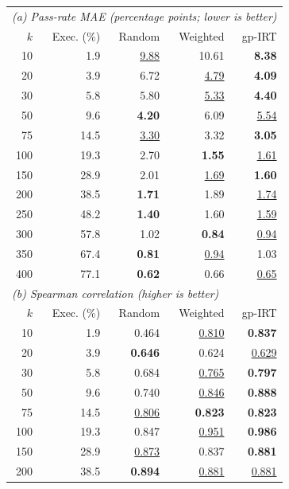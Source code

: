 \begin{table}[t]
  \centering
  \small
  \setlength{\tabcolsep}{3.5pt}
  \begin{tabular}{rrrrr}
    \toprule
    \multicolumn{5}{l}{\textit{(a) Pass-rate MAE (percentage points; lower is better)}} \\
    $k$ & Exec. (\%) & Random & Weighted & gp-IRT \\
    \midrule
    10 & 1.9 & \underline{9.88} & 10.61 & \textbf{8.38} \\
    20 & 3.9 & 6.72 & \underline{4.79} & \textbf{4.09} \\
    30 & 5.8 & 5.80 & \underline{5.33} & \textbf{4.40} \\
    50 & 9.6 & \textbf{4.20} & 6.09 & \underline{5.54} \\
    75 & 14.5 & \underline{3.30} & 3.32 & \textbf{3.05} \\
    100 & 19.3 & 2.70 & \textbf{1.55} & \underline{1.61} \\
    150 & 28.9 & 2.01 & \underline{1.69} & \textbf{1.60} \\
    200 & 38.5 & \textbf{1.71} & 1.89 & \underline{1.74} \\
    250 & 48.2 & \textbf{1.40} & 1.60 & \underline{1.59} \\
    300 & 57.8 & 1.02 & \textbf{0.84} & \underline{0.94} \\
    350 & 67.4 & \textbf{0.81} & \underline{0.94} & 1.03 \\
    400 & 77.1 & \textbf{0.62} & 0.66 & \underline{0.65} \\
    \midrule
    \multicolumn{5}{l}{\textit{(b) Spearman correlation (higher is better)}} \\
    $k$ & Exec. (\%) & Random & Weighted & gp-IRT \\
    \midrule
    10 & 1.9 & 0.464 & \underline{0.810} & \textbf{0.837} \\
    20 & 3.9 & \textbf{0.646} & 0.624 & \underline{0.629} \\
    30 & 5.8 & 0.684 & \underline{0.765} & \textbf{0.797} \\
    50 & 9.6 & 0.740 & \underline{0.846} & \textbf{0.888} \\
    75 & 14.5 & \underline{0.806} & \textbf{0.823} & \textbf{0.823} \\
    100 & 19.3 & 0.847 & \underline{0.951} & \textbf{0.986} \\
    150 & 28.9 & \underline{0.873} & 0.837 & \textbf{0.881} \\
    200 & 38.5 & \textbf{0.894} & \underline{0.881} & \underline{0.881} \\

\end{tabular}
\end{table}

